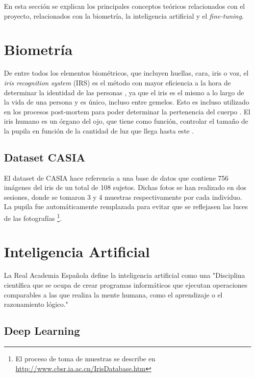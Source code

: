  \label{capitulo3}

En esta sección se explican los principales conceptos teóricos relacionados con el proyecto, relacionados con la biometría, la inteligencia
 artificial y el \textit{fine-tuning}.


\section{Biometría}

De entre todos los elementos biométricos, que incluyen huellas, cara, iris o voz, el \textit{iris recognition system} (IRS) es el método con mayor eficiencia a la hora de determinar la identidad
de las personas \cite{malgheet_iris_2021}, ya que el iris es el mismo a lo largo de la vida de una persona y es único, incluso entre gemelos. Esto es incluso utilizado en los procesos 
post-mortem para poder determinar la pertenencia del cuerpo \cite{boyd_post-mortem_2020}. El iris humano es un órgano del ojo, que tiene como función, controlar el tamaño
de la pupila en función de la cantidad de luz que llega hasta este \cite{boyd_post-mortem_2020}.

\subsection{Dataset CASIA}	

El dataset de CASIA hace referencia a una base de datos que contiene 756 imágenes del iris de un total de 108 sujetos. 
Dichas fotos se han realizado en dos sesiones, donde se tomaron 3 y 4 muestras respectivamente por cada individuo. 
La pupila fue automáticamente remplazada para evitar que se reflejasen las luces de las fotografías 
\footnote{El proceso de toma de muestras se describe en \url{http://www.cbsr.ia.ac.cn/IrisDatabase.htm}}.


\section{Inteligencia Artificial}

La Real Academia Española define la inteligencia artificial como una "Disciplina científica que se ocupa de crear programas informáticos que ejecutan 
operaciones comparables a las que realiza la mente humana, como el aprendizaje o el razonamiento lógico."

\subsection{Deep Learning}

